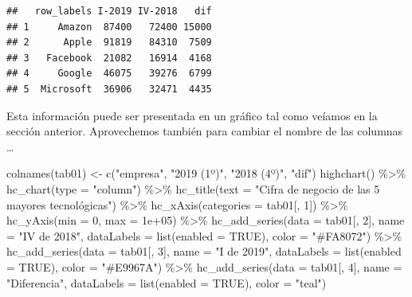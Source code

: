 \documentclass[
]{book}
\newenvironment{Shaded}{\begin{snugshade}}{\end{snugshade}}
\newcommand{\AttributeTok}[1]{\textcolor[rgb]{0.77,0.63,0.00}{#1}}
\newcommand{\ConstantTok}[1]{\textcolor[rgb]{0.00,0.00,0.00}{#1}}
\newcommand{\DecValTok}[1]{\textcolor[rgb]{0.00,0.00,0.81}{#1}}
\newcommand{\FloatTok}[1]{\textcolor[rgb]{0.00,0.00,0.81}{#1}}
\newcommand{\FunctionTok}[1]{\textcolor[rgb]{0.00,0.00,0.00}{#1}}
\newcommand{\NormalTok}[1]{#1}
\newcommand{\OtherTok}[1]{\textcolor[rgb]{0.56,0.35,0.01}{#1}}
\newcommand{\SpecialCharTok}[1]{\textcolor[rgb]{0.00,0.00,0.00}{#1}}
\newcommand{\StringTok}[1]{\textcolor[rgb]{0.31,0.60,0.02}{#1}}
\begin{document}
\begin{Shaded}
\end{Shaded}

\begin{verbatim}
##   row_labels I-2019 IV-2018   dif
## 1     Amazon  87400   72400 15000
## 2      Apple  91819   84310  7509
## 3   Facebook  21082   16914  4168
## 4     Google  46075   39276  6799
## 5  Microsoft  36906   32471  4435
\end{verbatim}

Esta información puede ser presentada en un gráfico tal como veíamos en la sección anterior. Aprovechemos también para cambiar el nombre de las columnas \ldots{}

\begin{Shaded}
\begin{Highlighting}[]
\FunctionTok{colnames}\NormalTok{(tab01) }\OtherTok{\textless{}{-}} \FunctionTok{c}\NormalTok{(}\StringTok{"empresa"}\NormalTok{, }\StringTok{"2019 (1º)"}\NormalTok{, }\StringTok{"2018 (4º)"}\NormalTok{,}
  \StringTok{"dif"}\NormalTok{)}
\FunctionTok{highchart}\NormalTok{() }\SpecialCharTok{\%\textgreater{}\%}
  \FunctionTok{hc\_chart}\NormalTok{(}\AttributeTok{type =} \StringTok{"column"}\NormalTok{) }\SpecialCharTok{\%\textgreater{}\%}
  \FunctionTok{hc\_title}\NormalTok{(}\AttributeTok{text =} \StringTok{"Cifra de negocio de las 5 mayores tecnológicas"}\NormalTok{) }\SpecialCharTok{\%\textgreater{}\%}
  \FunctionTok{hc\_xAxis}\NormalTok{(}\AttributeTok{categories =}\NormalTok{ tab01[, }\DecValTok{1}\NormalTok{]) }\SpecialCharTok{\%\textgreater{}\%}
  \FunctionTok{hc\_yAxis}\NormalTok{(}\AttributeTok{min =} \DecValTok{0}\NormalTok{, }\AttributeTok{max =} \FloatTok{1e+05}\NormalTok{) }\SpecialCharTok{\%\textgreater{}\%}
  \FunctionTok{hc\_add\_series}\NormalTok{(}\AttributeTok{data =}\NormalTok{ tab01[, }\DecValTok{2}\NormalTok{], }\AttributeTok{name =} \StringTok{"IV de 2018"}\NormalTok{,}
    \AttributeTok{dataLabels =} \FunctionTok{list}\NormalTok{(}\AttributeTok{enabled =} \ConstantTok{TRUE}\NormalTok{), }\AttributeTok{color =} \StringTok{"\#FA8072"}\NormalTok{) }\SpecialCharTok{\%\textgreater{}\%}
  \FunctionTok{hc\_add\_series}\NormalTok{(}\AttributeTok{data =}\NormalTok{ tab01[, }\DecValTok{3}\NormalTok{], }\AttributeTok{name =} \StringTok{"I de 2019"}\NormalTok{,}
    \AttributeTok{dataLabels =} \FunctionTok{list}\NormalTok{(}\AttributeTok{enabled =} \ConstantTok{TRUE}\NormalTok{), }\AttributeTok{color =} \StringTok{"\#E9967A"}\NormalTok{) }\SpecialCharTok{\%\textgreater{}\%}
  \FunctionTok{hc\_add\_series}\NormalTok{(}\AttributeTok{data =}\NormalTok{ tab01[, }\DecValTok{4}\NormalTok{], }\AttributeTok{name =} \StringTok{"Diferencia"}\NormalTok{,}
    \AttributeTok{dataLabels =} \FunctionTok{list}\NormalTok{(}\AttributeTok{enabled =} \ConstantTok{TRUE}\NormalTok{), }\AttributeTok{color =} \StringTok{"teal"}\NormalTok{)}
\end{Highlighting}
\end{Shaded}
\end{document}
